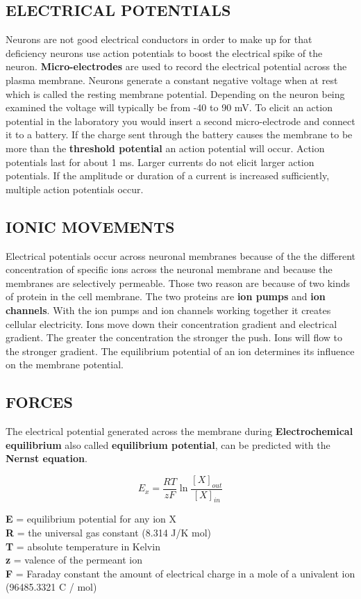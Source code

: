 \documentclass[english]{def}
\begin{document}
\subsection{ELECTRICAL POTENTIALS}
Neurons are not good electrical conductors in order to make up for that deficiency neurons use action potentials to boost the electrical spike of the neuron. \textbf{Micro-electrodes} are used to record the electrical potential across the plasma membrane. Neurons generate a constant negative voltage when at rest which is called the resting membrane potential. Depending on the neuron being examined the voltage will typically be from -40 to 90 mV.
To elicit an action potential in the laboratory you would insert a second micro-electrode and connect it to a battery. If the charge sent through the battery causes the membrane to be more than the \textbf{threshold potential} an action potential will occur. Action potentials last for about 1 ms. Larger currents do not elicit larger action potentials. If the amplitude or duration of a current is increased sufficiently, multiple action potentials occur. 

\subsection{IONIC MOVEMENTS}
Electrical potentials occur across neuronal membranes because of the the different concentration of specific ions across the neuronal membrane and because the membranes are selectively permeable. Those two reason are because of two kinds of protein  in the cell membrane. The two proteins are \textbf{ion pumps} and \textbf{ion channels}. With the ion pumps and ion channels working together it creates cellular electricity. Ions move down their concentration gradient and electrical gradient. The greater the concentration the stronger the push. Ions will flow to the stronger gradient. The equilibrium potential of an ion determines its influence on the membrane potential.

\subsection{FORCES}
The electrical potential generated across the membrane during \textbf{Electrochemical equilibrium} also called \textbf{equilibrium potential}, can be predicted with the \textbf{Nernst equation}.

\[E_x= \frac{R T}{z F} \ln \frac{[X]_{out}}{[X]_{in}}\]

\noindent\textbf{E} = equilibrium potential for any ion X\\
\textbf{R} = the universal gas constant (8.314 J/K mol)\\
\textbf{T} = absolute temperature in Kelvin\\
\textbf{z} = valence of the permeant ion\\
\textbf{F} = Faraday constant the amount of electrical charge in a mole of a univalent ion (96485.3321 C / mol)\\\\
\end{document}
